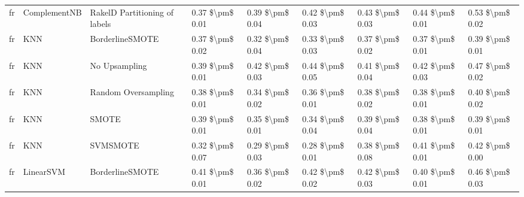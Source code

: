 \begin{tabular}{lllllllll}
      fr &                    ComplementNB & RakelD Partitioning of labels & 0.37 \$\textbackslash pm\$ 0.01 &           0.39 \$\textbackslash pm\$ 0.04 &       0.42 \$\textbackslash pm\$ 0.03 &        0.43 \$\textbackslash pm\$ 0.03 &                         0.44 \$\textbackslash pm\$ 0.01 &     0.53 \$\textbackslash pm\$ 0.02 \\
      fr &                             KNN &               BorderlineSMOTE & 0.37 \$\textbackslash pm\$ 0.02 &           0.32 \$\textbackslash pm\$ 0.04 &       0.33 \$\textbackslash pm\$ 0.03 &        0.37 \$\textbackslash pm\$ 0.02 &                         0.37 \$\textbackslash pm\$ 0.01 &     0.39 \$\textbackslash pm\$ 0.01 \\
      fr &                             KNN &                 No Upsampling & 0.39 \$\textbackslash pm\$ 0.01 &           0.42 \$\textbackslash pm\$ 0.03 &       0.44 \$\textbackslash pm\$ 0.05 &        0.41 \$\textbackslash pm\$ 0.04 &                         0.42 \$\textbackslash pm\$ 0.03 &     0.47 \$\textbackslash pm\$ 0.02 \\
      fr &                             KNN &           Random Oversampling & 0.38 \$\textbackslash pm\$ 0.01 &           0.34 \$\textbackslash pm\$ 0.02 &       0.36 \$\textbackslash pm\$ 0.01 &        0.38 \$\textbackslash pm\$ 0.02 &                         0.38 \$\textbackslash pm\$ 0.01 &     0.40 \$\textbackslash pm\$ 0.02 \\
      fr &                             KNN &                         SMOTE & 0.39 \$\textbackslash pm\$ 0.01 &           0.35 \$\textbackslash pm\$ 0.01 &       0.34 \$\textbackslash pm\$ 0.04 &        0.39 \$\textbackslash pm\$ 0.04 &                         0.38 \$\textbackslash pm\$ 0.01 &     0.39 \$\textbackslash pm\$ 0.01 \\
      fr &                             KNN &                      SVMSMOTE & 0.32 \$\textbackslash pm\$ 0.07 &           0.29 \$\textbackslash pm\$ 0.03 &       0.28 \$\textbackslash pm\$ 0.01 &        0.38 \$\textbackslash pm\$ 0.08 &                         0.41 \$\textbackslash pm\$ 0.01 &     0.42 \$\textbackslash pm\$ 0.00 \\
      fr &                       LinearSVM &               BorderlineSMOTE & 0.41 \$\textbackslash pm\$ 0.01 &           0.36 \$\textbackslash pm\$ 0.02 &       0.42 \$\textbackslash pm\$ 0.02 &        0.42 \$\textbackslash pm\$ 0.03 &                         0.40 \$\textbackslash pm\$ 0.01 &     0.46 \$\textbackslash pm\$ 0.03 \\

\end{tabular}

